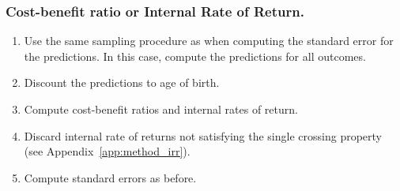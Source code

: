 \subsubsection{Cost-benefit ratio or Internal Rate of Return.}

\begin{enumerate}

\item Use the same sampling procedure as when computing the standard error for the predictions. In this case, compute the predictions for all outcomes. 
\item Discount the predictions to age of birth. 
\item Compute cost-benefit ratios and internal rates of return.
\item Discard internal rate of returns not satisfying the single crossing property (see Appendix~\ref{app:method_irr}). 
\item Compute standard errors as before. 

\end{enumerate}





